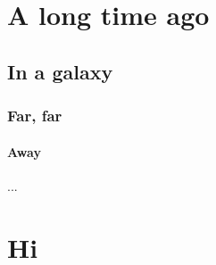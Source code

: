 \documentclass[11pt, a4paper]{scrartcl}
\begin{document}
\begin{multicols}{3}
\section{A long time ago}
\subsection{In a galaxy}
\subsubsection{Far, far}
\paragraph*{Away} ... 

\lipsum[1-14]
\section{Hi}
\lipsum[15-16]

\end{multicols}
\end{document}
